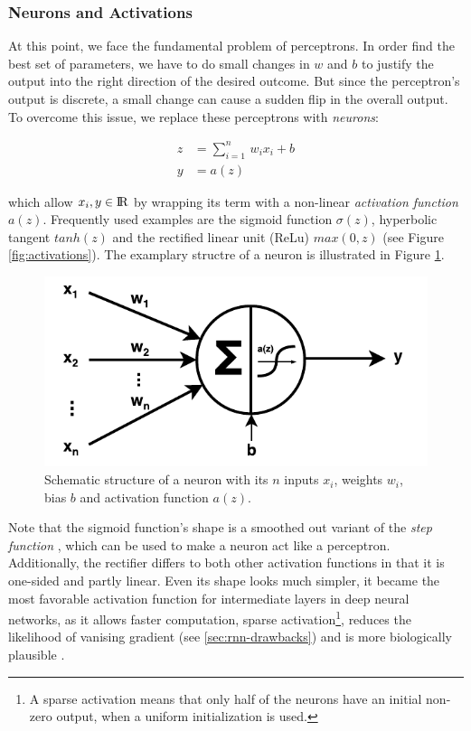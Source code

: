 \subsubsection{Neurons and Activations}

At this point, we face the fundamental problem of perceptrons. In order find the best set of parameters, we have to do small changes in $ w $ and $ b $ to justify the output into the right direction of the desired outcome. But since the perceptron's output is discrete, a small change can cause a sudden flip in the overall output. To overcome this issue, we replace these perceptrons with \textit{neurons}:

\begin{equation}
\begin{aligned}
z &= \sum\limits_{i=1}^n \, w_{i}x_{i} + b \\
y &= a(z)
\end{aligned}
\end{equation}

which allow $ x_{i}, y \in \rm I\!R $ by wrapping its term with a non-linear \textit{activation function} $ a(z) $. Frequently used examples are the sigmoid function $ \sigma(z) $, hyperbolic tangent $ tanh(z) $ and the rectified linear unit (ReLu) $ max(0, z) $ (see Figure \ref{fig:activations}). The examplary structre of a neuron is illustrated in Figure \ref{fig:neuron}.

\begin{figure}[htpb]
	\centering
	\includegraphics[scale=0.6]{figures/neuron.pdf}
	\caption[Schematic neuron]{Schematic structure of a neuron with its $ n $ inputs $x_{i}$, weights $w_{i}$, bias $ b $ and activation function $a(z)$.} \label{fig:neuron}
\end{figure}

Note that the sigmoid function's shape is a smoothed out variant of the \textit{step function} \parencite{neural_nets_deep_learning}, which can be used to make a neuron act like a perceptron. Additionally, the rectifier differs to both other activation functions in that it is one-sided and partly linear. Even its shape looks much simpler, it became the most favorable activation function for intermediate layers in deep neural networks, as it allows faster computation, sparse activation\footnote{{A sparse activation means that only half of the neurons have an initial non-zero output, when a uniform initialization is used.}}, reduces the likelihood of vanising gradient (see \ref{sec:rnn-drawbacks}) and is more biologically plausible \parencite{relu}.

